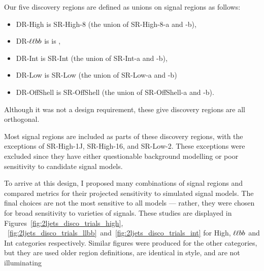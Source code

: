 Our five discovery regions are defined as unions on signal regions as follows:
\begin{itemize}
\item DR-High is SR-High-8 (the union of SR-High-8-a and -b),
\item DR-$\ell\ell bb$ is is \srllbb,
\item DR-Int is SR-Int (the union of SR-Int-a and -b),
\item DR-Low is SR-Low (the union of SR-Low-a and -b)
\item DR-OffShell is SR-OffShell (the union of SR-OffShell-a and -b).
\end{itemize}
Although it was not a design requirement, these give discovery regions are
all orthogonal.

Most signal regions are included as parts of these discovery regions, with the
exceptions of SR-High-1J, SR-High-16, and SR-Low-2.
These exceptions were excluded since they have either questionable background
modelling or poor sensitivity to candidate signal models.

To arrive at this design, I proposed many combinations of signal regions and
compared metrics for their projected sensitivity to simulated signal models.
The final choices are not the most sensitive to all models --- rather, they
were chosen for broad sensitivity to varieties of signals.
These studies are displayed in Figures~\ref{fig:2ljets_disco_trials_high},
~\ref{fig:2ljets_disco_trials_llbb}~and~\ref{fig:2ljets_disco_trials_int}
for High, $\ell\ell bb$ and Int categories respectively.
Similar figures were produced for the other categories, but they are used older
region definitions, are identical in style, and are not illuminating

